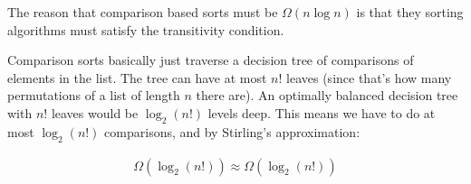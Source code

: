 \documentclass{article}
\begin{document}
The reason that comparison based sorts must be $\Omega(n \log n)$ is that they
sorting algorithms must satisfy the transitivity condition.

Comparison sorts basically just traverse a decision tree of comparisons of
elements in the list. The tree can have at most $n!$ leaves (since that's how
many permutations of a list of length $n$ there are). An optimally balanced
decision tree with $n!$ leaves would be $\log_2(n!)$ levels deep. This means we
have to do at most $\log_2(n!)$ comparisons, and by Stirling's approximation:

\begin{align*}
  \Omega(\log_2(n!)) \approx \Omega(\log_2(n!))
\end{align*}
\end{document}
